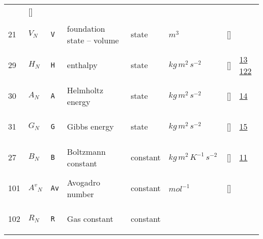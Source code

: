 \begin{longtable}{|p{1cm}|p{3cm}|p{3cm}|p{7cm}|p{3.0cm}|p{3cm}|p{2cm}|p{1cm}|}
             & []
             & \\
    21
             & \hypertarget{"v:21"}{ $ {V}{_{N}} $}
             & \verb|V|
             & foundation state – volume
             & \begin{lay}state \end{lay}
             & $ m^{3} \, $
             & []
             & \\
    29
             & \hypertarget{"v:29"}{ $ {H}{_{N}} $}
             & \verb|H|
             & enthalpy
             & \begin{lay}state \end{lay}
             & $ kg \,m^{2} \,s^{-2} \, $
             & []
             & \hyperlink{"e:13"}{ 13 }
                 \hyperlink{"e:122"}{ 122 }
                 \\
    30
             & \hypertarget{"v:30"}{ $ {A}{_{N}} $}
             & \verb|A|
             & Helmholtz energy
             & \begin{lay}state \end{lay}
             & $ kg \,m^{2} \,s^{-2} \, $
             & []
             & \hyperlink{"e:14"}{ 14 }
                 \\
    31
             & \hypertarget{"v:31"}{ $ {G}{_{N}} $}
             & \verb|G|
             & Gibbs energy
             & \begin{lay}state \end{lay}
             & $ kg \,m^{2} \,s^{-2} \, $
             & []
             & \hyperlink{"e:15"}{ 15 }
                 \\
    27
             & \hypertarget{"v:27"}{ $ {B}{_{N}} $}
             & \verb|B|
             & Boltzmann constant
             & \begin{lay}constant \end{lay}
             & $ kg \,m^{2} \,K^{-1} \,s^{-2} \, $
             & []
             & \hyperlink{"e:11"}{ 11 }
                 \\
    101
             & \hypertarget{"v:101"}{ $ {A^{v}}{_{N}} $}
             & \verb|Av|
             & Avogadro number
             & \begin{lay}constant \end{lay}
             & $ mol^{-1} \, $
             & []
             & \\
    102
             & \hypertarget{"v:102"}{ $ {R}{_{N}} $}
             & \verb|R|
             & Gas constant
             & \begin{lay}constant \end{lay}

\end{longtable}
